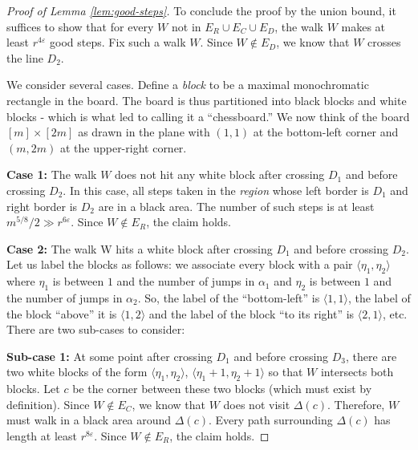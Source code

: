 \documentclass[10pt,a4paper]{article}
\theoremstyle{definition}%
\theoremstyle{plain}
\newcommand{\eps}{\varepsilon}
\begin{document}
\begin{proof}[Proof of Lemma \ref{lem:good-steps}]
To conclude the proof by the union bound, it suffices to show that for every $W$ not in $E_R \cup
E_C \cup E_D$, the walk $W$ makes at least $r^{4\eps}$ good steps. Fix such a walk $W$. Since $W \notin E_D$, we
know that $W$ crosses the line $D_2$. 


We consider several cases. Define a \emph{block} to be a maximal monochromatic rectangle in the board.
The board is thus partitioned into black blocks and white blocks - which is what led \cite{DvirMPY12} to calling it a  “chessboard.”
We now think of the board $[m] \times [2m]$ as drawn in the plane with $(1, 1)$ at the bottom-left corner and
$(m, 2m)$ at the upper-right corner.

\textbf{Case 1:}  The walk $W$ does not hit any white block after crossing $D_1$ and before crossing $D_2$.
In this case, all steps taken in the \emph{region} whose left border is $D_1$ and right border is $D_2$ are in a black
area. The number of such steps is at least $m^{5/8}/2\gg r^{6\eps}$. Since $W \notin E_R$, the claim holds.

\textbf{Case 2:}  The walk W hits a white block after crossing $D_1$ and before crossing $D_2$. Let us label the blocks as follows: we associate every block with a pair $\langle \eta_1, \eta_2\rangle$ where $\eta_1$ is between $1$ and the number of jumps in $\alpha_1$ and $\eta_2$ is between $1$ and the number of jumps
in $\alpha_2$. So, the label of the ``bottom-left'' is $\langle 1,1\rangle$, the label of the block ``above'' it is $\langle 1,2\rangle$ and the label of the block ``to its right'' is $\langle 2,1\rangle$, etc.  There are
two sub-cases to consider: 

\textbf{Sub-case 1:} At some point after crossing $D_1$ and before crossing $D_3$, there are two white blocks
of the form $\langle \eta_1, \eta_2\rangle$, $\langle\eta_1 + 1, \eta_2 + 1\rangle$ so that $W$ intersects
both blocks. Let $c$ be the corner between these two blocks (which must exist by definition). Since
$W \notin E_C$, we know that $W$ does not visit $\Delta(c)$. Therefore, $W$ must walk in a black area around
$\Delta(c)$. Every path surrounding $\Delta(c)$ has length at least $r^{8\eps}$. Since $W \notin E_R$, the claim holds.


\end{proof}
\end{document}
